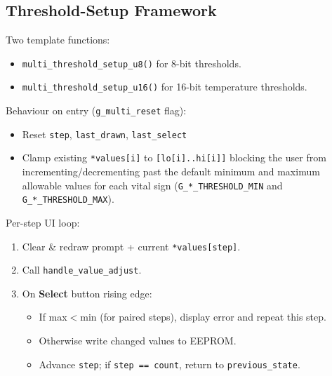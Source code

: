 \subsection{Threshold-Setup Framework}
Two template functions:
\begin{itemize}
	\item \lstinline|multi_threshold_setup_u8()| for 8-bit thresholds.
	\item \lstinline|multi_threshold_setup_u16()| for 16-bit temperature thresholds.
\end{itemize}
Behaviour on entry (\lstinline|g_multi_reset| flag):
\begin{itemize}
	\item Reset \lstinline|step|, \lstinline|last_drawn|, \lstinline|last_select|
	\item Clamp existing \lstinline|*values[i]| to \lstinline|[lo[i]..hi[i]]| blocking the user from incrementing/decrementing past the default minimum and maximum allowable values for each vital sign (\lstinline|G_*_THRESHOLD_MIN| and \lstinline|G_*_THRESHOLD_MAX|).
\end{itemize}
Per-step UI loop:
\begin{enumerate}
	\item Clear \& redraw prompt + current \lstinline|*values[step]|.
	\item Call \lstinline|handle_value_adjust|.
	\item On \textbf{Select} button rising edge:
	\begin{itemize}
		\item If max$<$min (for paired steps), display error and repeat this step.
		\item Otherwise write changed values to EEPROM.
		\item Advance \lstinline|step|; if \lstinline|step == count|, return to \lstinline|previous_state|.
	\end{itemize}
\end{enumerate}

